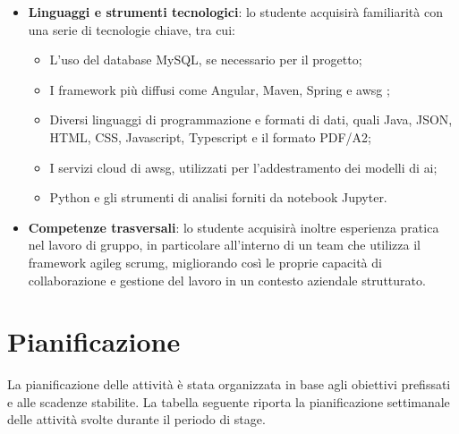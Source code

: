 \begin{itemize}
    \item \textbf{Linguaggi e strumenti tecnologici}: lo studente acquisirà familiarità con una serie di tecnologie chiave, tra cui:
    \begin{itemize}
        \item L'uso del database MySQL, se necessario per il progetto;
        \item I framework più diffusi come Angular, Maven, Spring e \gls{awsg} ;
        \item Diversi linguaggi di programmazione e formati di dati, quali Java, JSON, HTML, CSS, Javascript, Typescript e il formato PDF/A2;
        \item I servizi cloud di \gls{awsg}, utilizzati per l'addestramento dei modelli di \gls{ai};
        \item Python e gli strumenti di analisi forniti da notebook Jupyter.
    \end{itemize}
    \item \textbf{Competenze trasversali}: lo studente acquisirà inoltre esperienza pratica nel lavoro di gruppo, in particolare all'interno di un team che utilizza il framework \gls{agileg} \gls{scrumg}, migliorando così le proprie capacità di collaborazione e gestione del lavoro in un contesto aziendale strutturato.
\end{itemize}

\section{Pianificazione}

La pianificazione delle attività è stata organizzata in base agli obiettivi prefissati e alle scadenze stabilite. La tabella seguente riporta la pianificazione settimanale delle attività svolte durante il periodo di stage.

